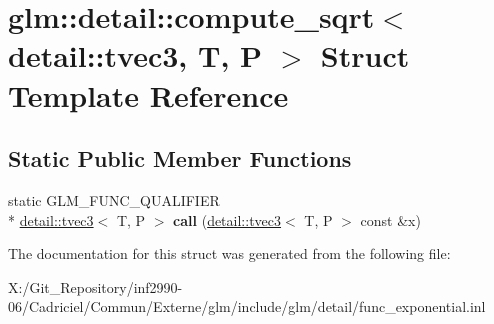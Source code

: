 \hypertarget{structglm_1_1detail_1_1compute__sqrt_3_01detail_1_1tvec3_00_01_t_00_01_p_01_4}{\section{glm\-:\-:detail\-:\-:compute\-\_\-sqrt$<$ detail\-:\-:tvec3, T, P $>$ Struct Template Reference}
\label{structglm_1_1detail_1_1compute__sqrt_3_01detail_1_1tvec3_00_01_t_00_01_p_01_4}
}
\subsection*{Static Public Member Functions}
\begin{DoxyCompactItemize}
\item 
\hypertarget{structglm_1_1detail_1_1compute__sqrt_3_01detail_1_1tvec3_00_01_t_00_01_p_01_4_a18a51ad87ca9848b797060c14651dafe}{static G\-L\-M\-\_\-\-F\-U\-N\-C\-\_\-\-Q\-U\-A\-L\-I\-F\-I\-E\-R \\*
\hyperlink{structglm_1_1detail_1_1tvec3}{detail\-::tvec3}$<$ T, P $>$ {\bfseries call} (\hyperlink{structglm_1_1detail_1_1tvec3}{detail\-::tvec3}$<$ T, P $>$ const \&x)}\label{structglm_1_1detail_1_1compute__sqrt_3_01detail_1_1tvec3_00_01_t_00_01_p_01_4_a18a51ad87ca9848b797060c14651dafe}

\end{DoxyCompactItemize}


The documentation for this struct was generated from the following file\-:\begin{DoxyCompactItemize}
\item 
X\-:/\-Git\-\_\-\-Repository/inf2990-\/06/\-Cadriciel/\-Commun/\-Externe/glm/include/glm/detail/func\-\_\-exponential.\-inl\end{DoxyCompactItemize}
